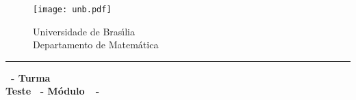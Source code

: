 \documentclass[12pt]{exam}
\begin{document}
    \begin{figure}[h]
        \begin{minipage}[c]{1.7cm}
            \texttt{[image: unb.pdf]}
        \end{minipage}
        \hspace{0pt}
        \begin{minipage}[c]{4in}
            {Universidade de Bras{\'\i}lia} \\
            {Departamento de Matem{\'a}tica}
        \end{minipage}
    \end{figure}
    \hrule
    \begin{center}
        {\Large\bf \disciplina\ - Turma \turma}  \\
         {\large\bf Teste \numeroteste\ - Módulo\ \modulo\ -\ \dataavaliacao}
    \end{center}

    \\
    \vspace*{.01cm}

    \vspace{.4cm}
\end{document}
